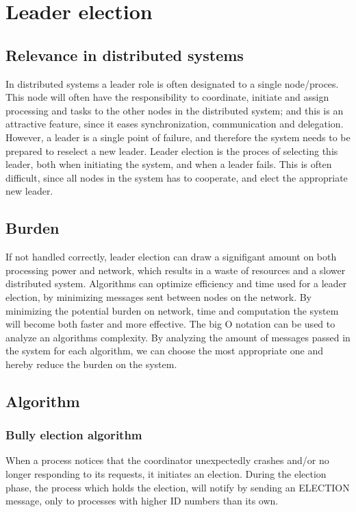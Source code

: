 \section{Leader election}
\subsection{Relevance in distributed systems}
In distributed systems a leader role is often designated to a single node/proces. This node will often have the responsibility to coordinate, initiate and assign processing and tasks to the other nodes in the distributed system; and this is an attractive feature, since it eases synchronization, communication and delegation.
However, a leader is a single point of failure, and therefore the system needs to be prepared to reselect a new leader.
Leader election is the proces of selecting this leader, both when initiating the system, and when a leader fails.
This is often difficult, since all nodes in the system has to cooperate, and elect the appropriate new leader.

\subsection{Burden}
If not handled correctly, leader election can draw a signifigant amount on both processing power and network, which results in a waste of resources and a slower distributed system. Algorithms can optimize efficiency and time used for a leader election, by minimizing messages sent between nodes on the network.
By minimizing the potential burden on network, time and computation the system will become both faster and more effective.
The big O notation can be used to analyze an algorithms complexity. By analyzing the amount of messages passed in the system for each algorithm, we can choose the most appropriate one and hereby reduce the burden on the system.

\subsection{Algorithm}

\subsubsection{Bully election algorithm}
When a process notices that the coordinator unexpectedly crashes and/or no longer responding to its requests, it initiates an election.
During the election phase, the process which holds the election, will notify by sending an ELECTION message, only to processes with higher ID numbers than its own.

